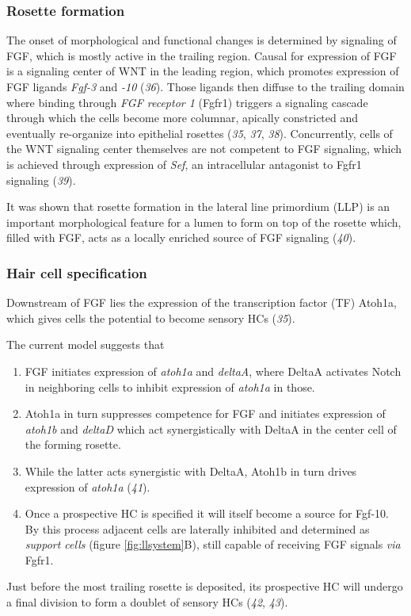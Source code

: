 \documentclass[11pt,singlespacinge,twoside]{reedthesis} %
\providecommand{\tightlist}{%
  \setlength{\itemsep}{0pt}\setlength{\parskip}{0pt}}
\theoremstyle{definition}
\theoremstyle{definition}
\theoremstyle{definition}
\theoremstyle{remark}
\begin{document}
\hypertarget{rosette-formation}{%
\subsubsection{Rosette formation}\label{rosette-formation}}

The onset of morphological and functional changes is determined by signaling of FGF, which is mostly active in the trailing region. Causal for expression of FGF is a signaling center of WNT in the leading region, which promotes expression of FGF ligands \emph{Fgf-3} and \emph{-10} (\emph{36}). Those ligands then diffuse to the trailing domain where binding through \emph{FGF receptor 1} (Fgfr1) triggers a signaling cascade through which the cells become more columnar, apically constricted and eventually re-organize into epithelial rosettes (\emph{35}, \emph{37}, \emph{38}). Concurrently, cells of the WNT signaling center themselves are not competent to FGF signaling, which is achieved through expression of \emph{Sef}, an intracellular antagonist to Fgfr1 signaling (\emph{39}).

It was shown that rosette formation in the lateral line primordium (LLP) is an important morphological feature for a lumen to form on top of the rosette which, filled with FGF, acts as a locally enriched source of FGF signaling (\emph{40}).

\hypertarget{intro-atoh}{%
\subsubsection{Hair cell specification}\label{intro-atoh}}

Downstream of FGF lies the expression of the transcription factor (TF) Atoh1a, which gives cells the potential to become sensory HCs (\emph{35}).

The current model suggests that
\begin{enumerate}
\def\labelenumi{\arabic{enumi}.}
\tightlist
\item
  FGF initiates expression of \emph{atoh1a} and \emph{deltaA}, where DeltaA activates Notch in neighboring cells to inhibit expression of \emph{atoh1a} in those.
\item
  Atoh1a in turn suppresses competence for FGF and initiates expression of \emph{atoh1b} and \emph{deltaD} which act synergistically with DeltaA in the center cell of the forming rosette.
\item
  While the latter acts synergistic with DeltaA, Atoh1b in turn drives expression of \emph{atoh1a} (\emph{41}).
\item
  Once a prospective HC is specified it will itself become a source for Fgf-10. By this process adjacent cells are laterally inhibited and determined as \emph{support cells} (figure \ref{fig:llsystem}B), still capable of receiving FGF signals \emph{via} Fgfr1.
\end{enumerate}
Just before the most trailing rosette is deposited, its prospective HC will undergo a final division to form a doublet of sensory HCs (\emph{42}, \emph{43}).
\end{document}
